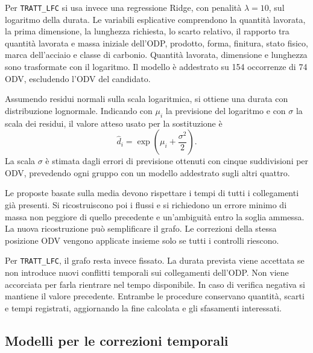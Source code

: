 Per \texttt{TRATT\_LFC} si usa invece una regressione Ridge, con penalità $\lambda=10$, sul logaritmo della durata. Le variabili esplicative comprendono la quantità lavorata, la prima dimensione, la lunghezza richiesta, lo scarto relativo, il rapporto tra quantità lavorata e massa iniziale dell'ODP, prodotto, forma, finitura, stato fisico, marca dell'acciaio e classe di carbonio. Quantità lavorata, dimensione e lunghezza sono trasformate con il logaritmo. Il modello è addestrato su 154 occorrenze di 74 ODV, escludendo l'ODV del candidato.

Assumendo residui normali sulla scala logaritmica, si ottiene una durata con distribuzione lognormale. Indicando con $\mu_i$ la previsione del logaritmo e con $\sigma$ la scala dei residui, il valore atteso usato per la sostituzione è
\begin{equation}
\label{eq:duration-lfc-expected-value}
\widehat{d}_i=\exp\left(\mu_i+\frac{\sigma^2}{2}\right).
\end{equation}
La scala $\sigma$ è stimata dagli errori di previsione ottenuti con cinque suddivisioni per ODV, prevedendo ogni gruppo con un modello addestrato sugli altri quattro.

Le proposte basate sulla media devono rispettare i tempi di tutti i collegamenti già presenti. Si ricostruiscono poi i flussi e si richiedono un errore minimo di massa non peggiore di quello precedente e un'ambiguità entro la soglia ammessa. La nuova ricostruzione può semplificare il grafo. Le correzioni della stessa posizione ODV vengono applicate insieme solo se tutti i controlli riescono.

Per \texttt{TRATT\_LFC}, il grafo resta invece fissato. La durata prevista viene accettata se non introduce nuovi conflitti temporali sui collegamenti dell'ODP. Non viene accorciata per farla rientrare nel tempo disponibile. In caso di verifica negativa si mantiene il valore precedente. Entrambe le procedure conservano quantità, scarti e tempi registrati, aggiornando la fine calcolata e gli sfasamenti interessati.

\subsection{Modelli per le correzioni temporali}
\label{sec:duration-correction-models}

